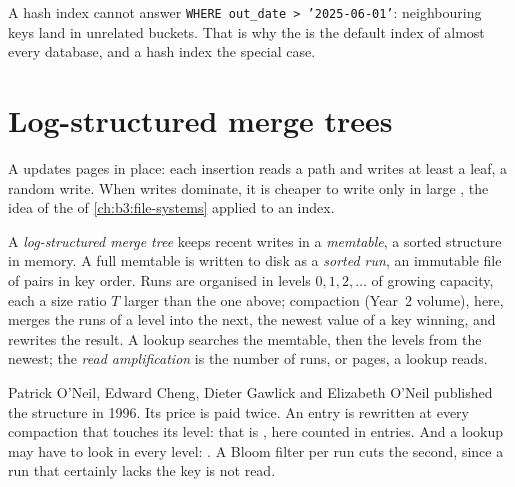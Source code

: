 A hash index cannot answer \texttt{WHERE out\_date > '2025-06-01'}: neighbouring keys land in unrelated buckets. That is why the  is the default index of almost every database, and a hash index the special case.

\section{Log-structured merge trees}\label{sec:b3:database-storage:lsm}

A  updates pages in place: each insertion reads a path and writes at least a leaf, a random write. When writes dominate, it is cheaper to write only in large , the idea of the  of \cref{ch:b3:file-systems} applied to an index.

\begin{definition}\label{def:b3:database-storage:lsm}
A \emph{log-structured merge tree} keeps recent writes in a \emph{memtable}, a sorted structure in memory. A full memtable is written to disk as a \emph{sorted run}, an immutable file of pairs in key order. Runs are organised in levels $0, 1, 2, \ldots$ of growing capacity, each a size ratio $T$ larger than the one above; compaction (Year~2 volume), here, merges the runs of a level into the next, the newest value of a key winning, and rewrites the result. A lookup searches the memtable, then the levels from the newest; the \emph{read amplification} is the number of runs, or pages, a lookup reads.
\end{definition}

Patrick O'Neil, Edward Cheng, Dieter Gawlick and Elizabeth O'Neil published the structure in 1996. %
Its price is paid twice. An entry is rewritten at every compaction that touches its level: that is , here counted in entries. And a lookup may have to look in every level: . A Bloom filter per run cuts the second, since a run that certainly lacks the key is not read.

\label{lst:b3:database-storage:lsm}

